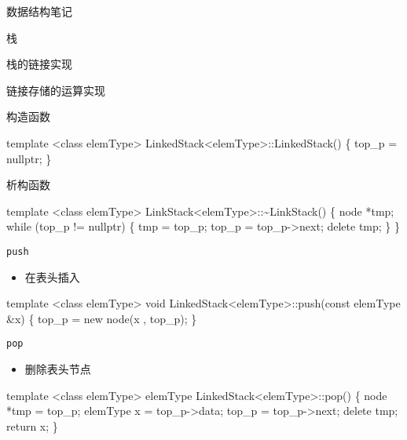 \documentclass[
  ignorenonframetext,
]{beamer}
\newenvironment{Shaded}{}{}
\newcommand{\NormalTok}[1]{#1}
\providecommand{\tightlist}{%
  \setlength{\itemsep}{0pt}\setlength{\parskip}{0pt}}
\begin{document}
\begin{frame}[fragile]{数据结构笔记}
\begin{block}{栈}
\begin{block}{栈的链接实现}
\begin{block}{链接存储的运算实现}
\begin{block}{构造函数}
\begin{Shaded}
\begin{Highlighting}[]
\NormalTok{template \textless{}class elemType\textgreater{}}
\NormalTok{LinkedStack\textless{}elemType\textgreater{}::LinkedStack()}
\NormalTok{\{}
\NormalTok{  top\_p = nullptr;}
\NormalTok{\}}
\end{Highlighting}
\end{Shaded}
\end{block}

\begin{block}{析构函数}
\protect{}\label{ux6790ux6784ux51fdux6570-2}
\begin{Shaded}
\begin{Highlighting}[]
\NormalTok{template \textless{}class elemType\textgreater{}}
\NormalTok{LinkStack\textless{}elemType\textgreater{}::\textasciitilde{}LinkStack()}
\NormalTok{\{}
\NormalTok{  node *tmp;}
\NormalTok{  while (top\_p != nullptr)}
\NormalTok{  \{}
\NormalTok{    tmp = top\_p;}
\NormalTok{    top\_p = top\_p{-}\textgreater{}next;}
\NormalTok{    delete tmp;}
\NormalTok{  \}}
\NormalTok{\}}
\end{Highlighting}
\end{Shaded}
\end{block}

\begin{block}{\texttt{push}}
\protect{}\label{push-1}
\begin{itemize}
\tightlist
\item
  在表头插入
\end{itemize}

\begin{Shaded}
\begin{Highlighting}[]
\NormalTok{template \textless{}class elemType\textgreater{}}
\NormalTok{void LinkedStack\textless{}elemType\textgreater{}::push(const elemType \&x)}
\NormalTok{\{}
\NormalTok{  top\_p = new node(x , top\_p);}
\NormalTok{\}}
\end{Highlighting}
\end{Shaded}
\end{block}

\begin{block}{\texttt{pop}}
\protect{}\label{pop-1}
\begin{itemize}
\tightlist
\item
  删除表头节点
\end{itemize}

\begin{Shaded}
\begin{Highlighting}[]
\NormalTok{template \textless{}class elemType\textgreater{}}
\NormalTok{elemType LinkedStack\textless{}elemType\textgreater{}::pop()}
\NormalTok{\{}
\NormalTok{  node *tmp = top\_p;}
\NormalTok{  elemType x = top\_p{-}\textgreater{}data;}
\NormalTok{  top\_p = top\_p{-}\textgreater{}next;}
\NormalTok{  delete tmp;}
\NormalTok{  return x;}
\NormalTok{\}}
\end{Highlighting}
\end{Shaded}
\end{block}


\end{block}
\end{block}
\end{block}
\end{frame}
\end{document}
